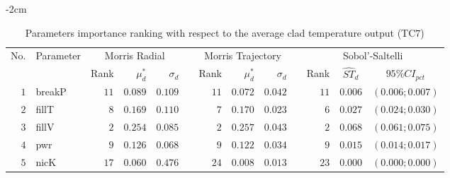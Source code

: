 \begin{table*}[!htbp]\centering
{}
\begin{adjustwidth*}{}{-2cm}
\caption{Parameters importance ranking with respect to the average clad temperature output (TC$7$)}
\label{tab:app_screening_tc7_average}
\begin{tabular}{@{}rlrrrrrrrrrcc@{}}\toprule
\multirow{2}{*}{\footnotesize{No.}} & \multirow{2}{*}{\footnotesize{Parameter}} & \multicolumn{3}{c}{\footnotesize{Morris Radial}} & \phantom{a} & \multicolumn{3}{c}{\footnotesize{Morris Trajectory}}  &\phantom{a}& \multicolumn{3}{c}{\footnotesize{Sobol'-Saltelli}}                               \\             
                                                                                  \cmidrule{3-5}                                                   \cmidrule{7-9}                                                      \cmidrule{11-13}
                                    &                                           & \footnotesize{Rank}   & $\mu^*_d$ & $\sigma_d$   &             & \footnotesize{Rank} & $\mu^*_d$ & $\sigma_d$          &           & \footnotesize{Rank} & \footnotesize{$\hat{ST}_d$} & \footnotesize{$95\%CI_{pct}$}\\ \midrule
\footnotesize{$1 $} & \footnotesize{breakP   } & \footnotesize{$11$} & \footnotesize{$0.089$} & \footnotesize{$0.109$} && \footnotesize{$11$} & \footnotesize{$0.072$} & \footnotesize{$0.042$} && \footnotesize{$11$} & \footnotesize{$0.006$} & \footnotesize{$(0.006;0.007)$} \\
\footnotesize{$2 $} & \footnotesize{fillT    } & \footnotesize{$8 $} & \footnotesize{$0.169$} & \footnotesize{$0.110$} && \footnotesize{$7 $} & \footnotesize{$0.170$} & \footnotesize{$0.023$} && \footnotesize{$6 $} & \footnotesize{$0.027$} & \footnotesize{$(0.024;0.030)$} \\
\footnotesize{$3 $} & \footnotesize{fillV    } & \footnotesize{$2 $} & \footnotesize{$0.254$} & \footnotesize{$0.085$} && \footnotesize{$2 $} & \footnotesize{$0.257$} & \footnotesize{$0.043$} && \footnotesize{$2 $} & \footnotesize{$0.068$} & \footnotesize{$(0.061;0.075)$} \\
\footnotesize{$4 $} & \footnotesize{pwr      } & \footnotesize{$9 $} & \footnotesize{$0.126$} & \footnotesize{$0.068$} && \footnotesize{$9 $} & \footnotesize{$0.122$} & \footnotesize{$0.034$} && \footnotesize{$9 $} & \footnotesize{$0.015$} & \footnotesize{$(0.014;0.017)$} \\
\footnotesize{$5 $} & \footnotesize{nicK     } & \footnotesize{$17$} & \footnotesize{$0.060$} & \footnotesize{$0.476$} && \footnotesize{$24$} & \footnotesize{$0.008$} & \footnotesize{$0.013$} && \footnotesize{$23$} & \footnotesize{$0.000$} & \footnotesize{$(0.000;0.000)$} \\

\end{tabular}
\end{adjustwidth*}
\end{table*}

